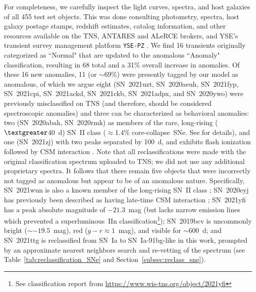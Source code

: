 \documentclass[twocolumn]{aastex63}
\begin{document}
For completeness, we carefully inspect the light curves, spectra, and host galaxies of all 455 test set objects. This was done consulting photometry, spectra, host galaxy postage stamps, redshift estimates, catalog information, and other resources available on the TNS, ANTARES \citep{Matheson2021} and ALeRCE \citep{Forster2021} brokers, and YSE's transient survey management platform \texttt{YSE-PZ} \citep{Coulter2022_YSEPZ}. We find 16 transients originally categorized as ``Normal" that are updated to the anomalous ``Anomaly" classification, resulting in 68 total and a 31\% overall increase in anomalies. Of these 16 new anomalies, 11 (or $\sim$69\%) were presently tagged by our model as anomalous, of which we argue eight (SN~2021uzt, SN~2020aeuh, SN~2021fyp, SN~2021cpi, SN~2021ackd, SN~2021ckb, SN~2021adpx, and SN~2020ywo) were previously misclassified on TNS (and therefore, should be considered spectroscopic anomalies) and three can be characterized as behavioral anomalies: two (SN~2020abah, SN~2020rmk) as members of the rare, long-rising ($\textgreater$40~d) SN~II class ($\approx$1.4\% core-collapse~SNe. See \cite{Sit2022} for details), and one (SN~2021zj) with two peaks separated by 100~d, and exhibits flash ionization followed by CSM interaction \citep{Jacobson-Galan2024}. Note that all reclassifications were made with the original classification spectrum uploaded to TNS; we did not use any additional proprietary spectra. It follows that there remain five objects that were incorrectly not tagged as anomalous but appear to be of an anomalous nature. Specifically, SN~2021wun is also a known member of the long-rising SN~II class \citep{Sit2022}; SN~2020eyj has previously been described as having late-time CSM interaction \citep{Fremling2020}; SN~2021yfi has a peak absolute magnitude of $-21.3$~mag (but lacks narrow emission lines which prevented a superluminous~IIn classification\footnote{See classification report from \url{https://www.wis-tns.org/object/2021yfi}}); SN~2019bcv is uncommonly bright ($\sim-19.5$~mag), red ($g-r\approx1$~mag), and visible for $\sim$600~d; and SN~2021ttg is reclassified from SN~Ia to SN~Ia-91bg-like in this work, prompted by an approximate nearest neighbors search and re-vetting of the spectrum (see Table~\ref{tab:reclassification_SNe} and Section~\ref{subsec:reclass_sne}). \par
\end{document}
